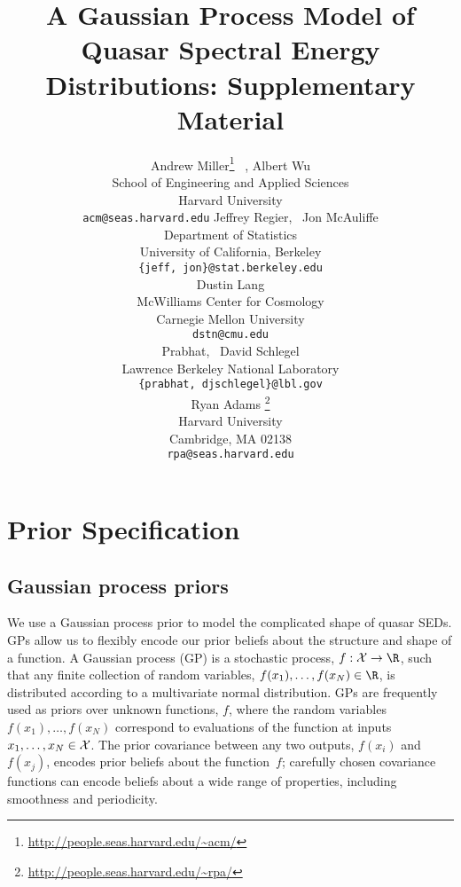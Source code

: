 \documentclass{article} %
\title{A Gaussian Process Model of Quasar Spectral Energy Distributions: Supplementary Material}
\author{
Andrew Miller\thanks{\url{http://people.seas.harvard.edu/\~acm/}} \, ,  Albert Wu \\
School of Engineering and Applied Sciences\\
Harvard University\\
\texttt{acm@seas.harvard.edu}
\And
Jeffrey Regier, \, Jon McAuliffe \\
Department of Statistics \\
University of California, Berkeley \\
\texttt{\{jeff, jon\}@stat.berkeley.edu} \\
\And
Dustin Lang \\
McWilliams Center for Cosmology \\
Carnegie Mellon University \\
\texttt{dstn@cmu.edu} \\
\And
Prabhat, \, David Schlegel \\
Lawrence Berkeley National Laboratory \\
\texttt{\{prabhat, djschlegel\}@lbl.gov} \\
\And
Ryan Adams \thanks{\url{http://people.seas.harvard.edu/\~rpa/}}\\
Harvard University\\
Cambridge, MA 02138 \\
\texttt{rpa@seas.harvard.edu} \\
}
\begin{document}
\maketitle

%

\section{Prior Specification}

\subsection{Gaussian process priors}
We use a Gaussian process prior to model the complicated shape of quasar SEDs.  GPs allow us to flexibly encode our prior beliefs about the structure and shape of a function. 
A Gaussian process (GP) is a stochastic process, ${f: \mathcal{X} \rightarrow \R}$, such that any finite collection of random variables, ${f(x_1),\dots, f(x_N) \in \R}$, is distributed according to a multivariate normal distribution.  
GPs are frequently used as priors over unknown functions, $f$, where the random variables $f(x_1), \dots, f(x_N)$ correspond to evaluations of the function at inputs ${x_1, \dots, x_N \in \mathcal{X}}$.  
The prior covariance between any two outputs, $f(x_i)$ and $f(x_j)$, encodes prior beliefs about the function~$f$; carefully chosen covariance functions can encode beliefs about a wide range of properties, including smoothness and periodicity.  
\end{document}
